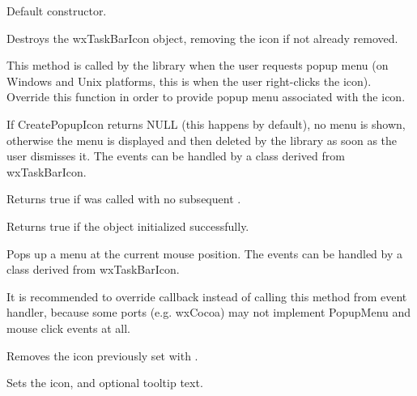
\label{wxtaskbariconctor}


Default constructor.

\label{wxtaskbaricondtor}


Destroys the wxTaskBarIcon object, removing the icon if not already removed.

\label{wxtaskbariconcreatepopupmenu}


This method is called by the library when the user requests popup menu
(on Windows and Unix platforms, this is when the user right-clicks the icon).
Override this function in order to provide popup menu associated with the icon.

If CreatePopupIcon returns NULL (this happens by default),
no menu is shown, otherwise the menu is
displayed and then deleted by the library as soon as the user dismisses it.
The events can be handled by a class derived from wxTaskBarIcon.

\label{wxtaskbariconisiconinstalled}


Returns true if  was called with no subsequent .

\label{wxtaskbariconisok}


Returns true if the object initialized successfully.

\label{wxtaskbariconpopupmenu}


Pops up a menu at the current mouse position. The events can be handled by
a class derived from wxTaskBarIcon.


It is recommended to override
callback instead of calling this method from event handler, because some
ports (e.g. wxCocoa) may not implement PopupMenu and mouse click events at all.

\label{wxtaskbariconremoveicon}


Removes the icon previously set with .

\label{wxtaskbariconseticon}


Sets the icon, and optional tooltip text.


